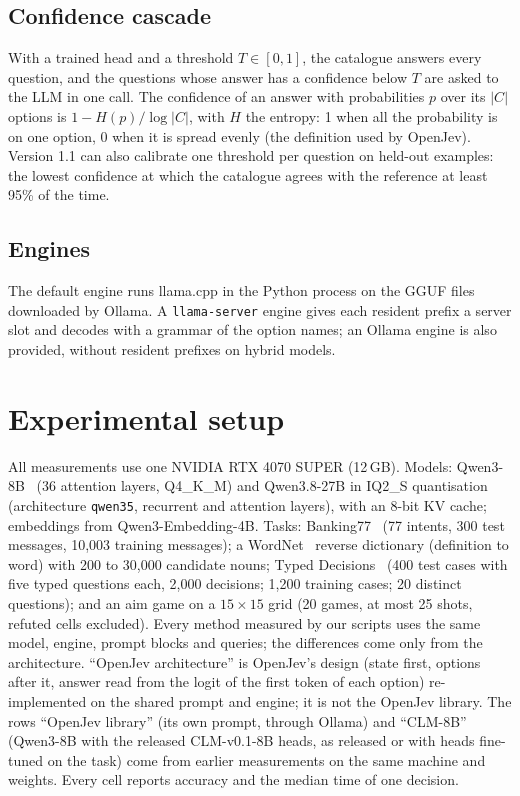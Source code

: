 \documentclass[11pt]{article}
\begin{document}
\subsection{Confidence cascade}\label{sec:cascade}
With a trained head and a threshold $T \in [0, 1]$, the catalogue answers every question, and the questions whose
answer has a confidence below $T$ are asked to the LLM in one call. The confidence of an answer with probabilities
$p$ over its $|C|$ options is $1 - H(p)/\log|C|$, with $H$ the entropy: 1 when all the probability is on one option, 0
when it is spread evenly (the definition used by OpenJev). Version 1.1 can also calibrate one threshold per question on
held-out examples: the lowest confidence at which the catalogue agrees with the reference at least 95\% of the time.

\subsection{Engines}
The default engine runs llama.cpp in the Python process on the GGUF files downloaded by Ollama. A
\texttt{llama-server} engine gives each resident prefix a server slot and decodes with a grammar of the option names;
an Ollama engine is also provided, without resident prefixes on hybrid models.

\section{Experimental setup}
All measurements use one NVIDIA RTX 4070 SUPER (12\,GB). Models: Qwen3-8B~\citep{qwen3} (36 attention layers,
Q4\_K\_M) and Qwen3.8-27B in IQ2\_S quantisation (architecture \texttt{qwen35}, recurrent and attention layers), with an
8-bit KV cache; embeddings from Qwen3-Embedding-4B. Tasks: Banking77~\citep{banking77} (77 intents, 300 test
messages, 10{,}003 training messages); a WordNet~\citep{wordnet} reverse dictionary (definition to word) with 200 to
30{,}000 candidate nouns; Typed Decisions~\citep{typeddecisions} (400 test cases with five typed questions each, 2{,}000
decisions; 1{,}200 training cases; 20 distinct questions); and an aim game on a $15\times15$ grid (20 games, at most 25
shots, refuted cells excluded). Every method measured by our scripts uses the same model, engine, prompt blocks and
queries; the differences come only from the architecture. ``OpenJev architecture'' is OpenJev's design (state first,
options after it, answer read from the logit of the first token of each option) re-implemented on the shared prompt and
engine; it is not the OpenJev library. The rows ``OpenJev library'' (its own prompt, through Ollama) and ``CLM-8B''
(Qwen3-8B with the released CLM-v0.1-8B heads, as released or with heads fine-tuned on the task) come from earlier
measurements on the same machine and weights. Every cell reports accuracy and the median time of one decision.
\end{document}
